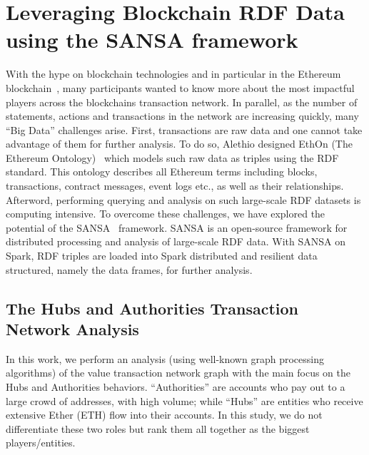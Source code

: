 \section{Leveraging Blockchain RDF Data using the SANSA framework}
\label{sec:alethio-use-case}
With the hype on blockchain technologies and in particular in the Ethereum blockchain~\cite{wood2014ethereum}, many participants wanted to know more about the most impactful players across the blockchains transaction network.
In parallel, as the number of statements, actions and transactions in the network are increasing quickly, many ``Big Data'' challenges arise.
First, transactions are raw data and one cannot take advantage of them for further analysis.
To do so, Alethio designed EthOn (The Ethereum Ontology)~\cite{pfeffer2016ethon} which models such raw data as triples using the \gls{RDF} standard.
This ontology describes all Ethereum terms including blocks, transactions, contract messages, event logs etc., as well as their relationships.
Afterword, performing querying and analysis on such large-scale RDF datasets is computing intensive.
To overcome these challenges, we have explored the potential of the SANSA~\cite{lehmann-2017-sansa-iswc} framework.
SANSA is an open-source framework for distributed processing and analysis of large-scale RDF data.
With SANSA on Spark, \gls{RDF} triples are loaded into Spark distributed and resilient data structured, namely the data frames, for further analysis.

\subsection{The Hubs and Authorities Transaction Network Analysis}
\label{sec:the-hub-and-authorities-use-case}
In this work, we perform an analysis (using well-known graph processing algorithms) of the value transaction network graph with the main focus on the Hubs and Authorities behaviors.
``Authorities'' are accounts who pay out to a large crowd of addresses, with high volume; while ``Hubs'' are entities who receive extensive Ether (ETH) flow into their accounts.
In this study, we do not differentiate these two roles but rank them all together as the biggest players/entities.


